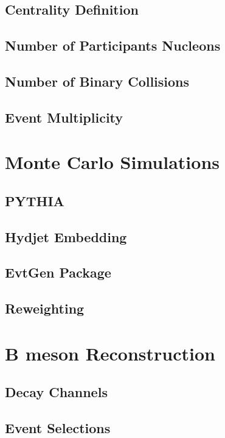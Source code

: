 \subsection{Centrality Definition}

\subsection{Number of Participants Nucleons}

\subsection{Number of Binary Collisions}

\subsection{Event Multiplicity}

\section{Monte Carlo Simulations} 

\subsection{PYTHIA}

\subsection{Hydjet Embedding}

\subsection{EvtGen Package}

\subsection{Reweighting}

\section{B meson Reconstruction} 

\subsection{Decay Channels}

\subsection{Event Selections}

